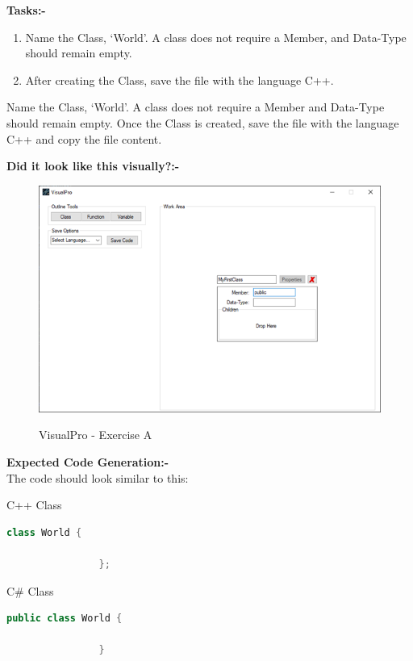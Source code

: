 \documentclass[10pt]{article}
\begin{document}
        \textbf{Tasks:-}
        \begin{enumerate}
            \item Name the Class, `World'. A class does not require a Member, and Data-Type should remain empty.
            \item After creating the Class, save the file with the language C++.
        \end{enumerate}
        Name the Class, `World'. A class does not require a Member and Data-Type should remain empty. Once the Class is created, save the file with the language C++ and copy the file content.

        \textbf{Did it look like this visually?:-}
            \begin{figure}[h]
                \centering
                {\includegraphics[scale=0.75]{Figures/Exercises/SecB-1.png}}
                \caption{VisualPro - Exercise A}
                \label{fig:vp-eA}
            \end{figure}

        \textbf{Expected Code Generation:-}\\
        The code should look similar to this:
        \begin{example}{C++ Class}
            \begin{lstlisting}[language=c++]
                class World {

                };
            \end{lstlisting}
        \end{example}

        \begin{example}{C\# Class}
            \begin{lstlisting}[language=java]
                public class World {

                }
            \end{lstlisting}
        \end{example}
    \newpage
\end{document}
